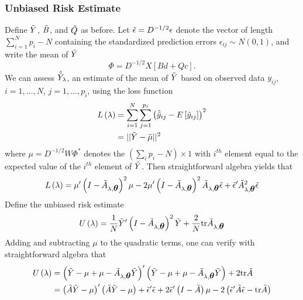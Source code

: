 \subsubsection{Unbiased Risk Estimate}

Define  $\tilde{Y}$, $\tilde{B}$, and $\tilde{Q}$ as before. Let $\tilde{\epsilon} = D^{-1/2} \epsilon$ denote the vector of length  $\sum_{i = 1}^N p_i - N$ containing the standardized prediction errors $\epsilon_{ij} \sim N\left(0,1\right)$, and write the mean of $\tilde{Y}$ 
\begin{equation} 
\Phi = D^{-1/2} X \left[ Bd + Qc \right].
\end{equation}
\noindent
We can assess $\hat{\tilde{Y}}_\lambda$, an estimate of the mean of $\tilde{Y}$ based on observed data $y_{ij}$, $i = 1,\dots, N$, $j = 1,\dots, p_i$, using the loss function
\begin{align}
\begin{split}
L\left(\lambda\right) &= \sum_{i = 1}^N \sum_{j = 1}^{p_i} \left(\hat{\tilde{y}}_{ij} - E\left[\tilde{y}_{ij}\right] \right)^2\\
&= \vert \vert \tilde{Y} - \tilde{\mu} \vert \vert^2
\end{split}
\end{align}
\noindent
where $\mu = D^{-1/2}W \Phi^*$ denotes the $\left( \sum \limits_{i} p_i - N\right) \times 1$ with $i^{th}$ element equal to the expected value of the  $i^{th}$ element of $\tilde{Y}$.  Then straightforward algebra yields that 
\begin{align} 
L\left(\lambda\right) = \mu'\left( I - \tilde{A}_{\lambda,\mbox{\boldmath $\theta$}} \right)^2\mu - 2\mu'\left( I - \tilde{A}_{\lambda,\mbox{\boldmath $\theta$}} \right)^2 \tilde{A}_{\lambda,\mbox{\boldmath $\theta$}} \tilde{\epsilon} + \tilde{\epsilon}' \tilde{A}_{\lambda,\mbox{\boldmath $\theta$}}^2 \tilde{\epsilon}
\end{align}
Define the unbiased risk estimate
\begin{equation} 
U\left(\lambda\right) = \frac{1}{N}\tilde{Y}'\left( I - \tilde{A}_{\lambda,\mbox{\boldmath $\theta$}} \right)^2\tilde{Y} + \frac{2}{N}\mbox{tr}\tilde{A}_{\lambda,\mbox{\boldmath $\theta$}}
\end{equation}
 \noindent
Adding and subtracting $\mu$ to the quadratic terms, one can verify with straightforward algebra that
\begin{align}
\begin{split}
U\left(\lambda\right) &= \left( \tilde{Y} - \mu + \mu - \tilde{A}_{\lambda,\mbox{\boldmath $\theta$}} \tilde{Y} \right)'\left( \tilde{Y} - \mu + \mu - \tilde{A}_{\lambda,\mbox{\boldmath $\theta$}} \tilde{Y} \right) + 2\mbox{tr}\tilde{A} \\
&= \left(\tilde{A} \tilde{Y} - \mu \right)'\left( \tilde{A} \tilde{Y} - \mu \right) + \tilde{\epsilon}'\tilde{\epsilon} + 2\tilde{\epsilon}' \left( I- \tilde{A}\right)\mu- 2\left( \tilde{\epsilon}'\tilde{A} \tilde{\epsilon} -  \mbox{tr}\tilde{A}\right)
\end{split}
\end{align}
